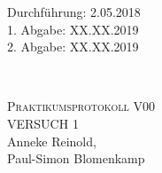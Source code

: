 



\begin{titlepage}
  \begin{flushleft}
 Durchführung: 2.05.2018\\
 1. Abgabe: XX.XX.2019\\
 2. Abgabe: XX.XX.2019
  \end{flushleft}


\HRule\\[1,0cm]

 \begin{center}


\textsc{\LARGE Praktikumsprotokoll V00}\\[1.5cm]
\textsc{\huge VERSUCH 1} \\[5,5cm]

Anneke Reinold\footnotemark[1], \\
Paul-Simon Blomenkamp\footnotemark[2] \\[1,0cm]



 \end{center}
\HRule

 \vfill
\end{titlepage}






\printbibliography



